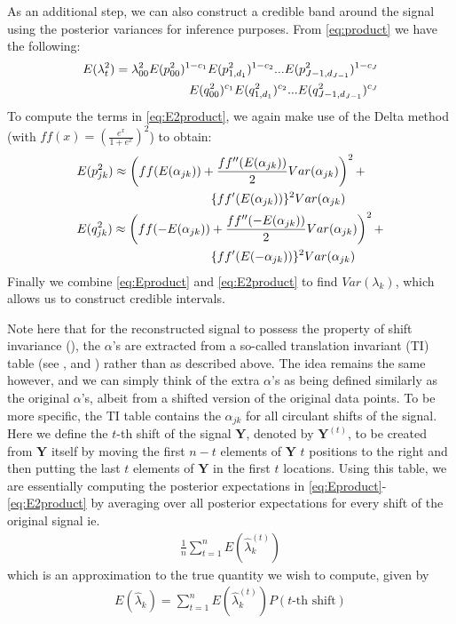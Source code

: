 \documentclass[12pt]{article}
\newcommand{\Ga}{\alpha}
\newcommand{\Gl}{\lambda}    \newcommand{\GL}{\Lambda}
\begin{document}
\begin{appendices}
As an additional step, we can also construct a credible band around the signal using the posterior variances for inference purposes. From \eqref{eq:product} we have the following:
\begin{eqnarray}\label{eq:E2product}E(\Gl_t^2)=\Gl_{00}^2E(p_{00}^2)^{1-c_1}E(p_{1,d_1}^2)^{1-c_2}...E(p_{J-1,d_{J-1}}^2)^{1-c_J}\notag\\
E(q_{00}^2)^{c_1}E(q_{1,d_1}^2)^{c_2}...E(q_{J-1,d_{J-1}}^2)^{c_J}\end{eqnarray}
To compute the terms in \eqref{eq:E2product}, we again make use of the Delta method (with $ff(x)=(\frac{e^x}{1+e^x})^2$) to obtain:
\begin{eqnarray}
&E(p_{jk}^2)\approx \left(ff(E(\Ga_{jk}))+\frac{ff''(E(\Ga_{jk}))}{2}Var(\Ga_{jk})\right)^2+\notag\\
& \hspace{1.5 in}\{ff'(E(\Ga_{jk}))\}^2Var(\Ga_{jk})\\
&E(q_{jk}^2)\approx \left(ff(-E(\Ga_{jk}))+\frac{ff''(-E(\Ga_{jk}))}{2}Var(\Ga_{jk})\right)^2+\notag\\
& \hspace{1.5 in}\{ff'(E(-\Ga_{jk}))\}^2Var(\Ga_{jk})
\end{eqnarray}
Finally we combine \eqref{eq:Eproduct} and \eqref{eq:E2product} to find $Var(\Gl_k)$, which allows us to construct credible intervals.

Note here that for the reconstructed signal to possess the property of shift invariance (\cite{Coifman1995Translationinvariant}), the $\Ga$'s are extracted from a so-called translation invariant (TI) table (see \cite{Coifman1995Translationinvariant}, and \cite{Kolaczyk1999Bayesian}) rather than as described above. The idea remains the same however, and we can simply think of the extra $\Ga$'s as being defined similarly as the original $\Ga$'s, albeit from a shifted version of the original data points. To be more specific, the TI table contains the $\Ga_{jk}$ for all circulant shifts of the signal. Here we define the $t$-th shift of the signal $\bm{Y}$, denoted by $\bm{Y}^{(t)}$, to be created from $\bm{Y}$ itself by moving the first $n-t$ elements of $\bm{Y}$ $t$ positions to the right and then putting the last $t$ elements of $\bm{Y}$ in the first $t$ locations. Using this table, we are essentially computing the posterior expectations in \eqref{eq:Eproduct}-\eqref{eq:E2product} by averaging over all posterior expectations for every shift of the original signal ie.
\begin{eqnarray}
\label{eq:TIapproxexp}\frac{1}{n}\sum_{t=1}^n E(\hat{\Gl}_k^{(t)})
\end{eqnarray}
which is an approximation to the true quantity we wish to compute, given by
\begin{eqnarray}
E(\hat{\Gl}_k)=\sum_{t=1}^n E(\hat{\Gl}_k^{(t)})P(\mbox{$t$-th shift})
\end{eqnarray}
\end{appendices}



\end{document}
